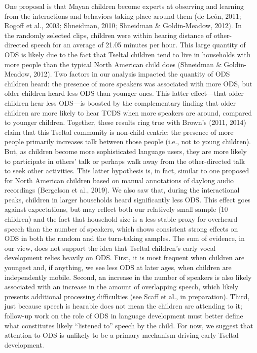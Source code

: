 \documentclass[floatsintext,man]{apa6}
\theoremstyle{definition}
\theoremstyle{definition}
\theoremstyle{definition}
\theoremstyle{remark}
\begin{document}
One proposal is that Mayan children become experts at observing and
learning from the interactions and behaviors taking place around them
(de León, 2011; Rogoff et al., 2003; Shneidman, 2010; Shneidman \&
Goldin-Meadow, 2012). In the randomly selected clips, children were
within hearing distance of other-directed speech for an average of 21.05
minutes per hour. This large quantity of ODS is likely due to the fact
that Tseltal children tend to live in households with more people than
the typical North American child does (Shneidman \& Goldin-Meadow,
2012). Two factors in our analysis impacted the quantity of ODS children
heard: the presence of more speakers was associated with more ODS, but
older children heard less ODS than younger ones. This latter
effect---that older children hear less ODS---is boosted by the
complementary finding that older children are more likely to hear TCDS
when more speakers are around, compared to younger children. Together,
these results ring true with Brown's (2011, 2014) claim that this
Tseltal community is non-child-centric; the presence of more people
primarily increases talk between those people (i.e., not to young
children). But, as children become more sophisticated language users,
they are more likely to participate in others' talk or perhaps walk away
from the other-directed talk to seek other activities. This latter
hypothesis is, in fact, similar to one proposed for North American
children based on manual annotations of daylong audio recordings
(Bergelson et al., 2019). We also saw that, during the interactional
peaks, children in larger households heard significantly less ODS. This
effect goes against expectations, but may reflect both our relatively
small sample (10 children) and the fact that household size is a less
stable proxy for overheard speech than the number of speakers, which
shows consistent strong effects on ODS in both the random and the
turn-taking samples. The sum of evidence, in our view, does not support
the idea that Tseltal children's early vocal development relies heavily
on ODS. First, it is most frequent when children are youngest and, if
anything, we see less ODS at later ages, when children are independently
mobile. Second, an increase in the number of speakers is also likely
associated with an increase in the amount of overlapping speech, which
likely presents additional processing difficulties (see Scaff et al., in
preparation). Third, just because speech is hearable does not mean the
children are attending to it; follow-up work on the role of ODS in
language development must better define what constitutes likely
\enquote{listened to} speech by the child. For now, we suggest that
attention to ODS is unlikely to be a primary mechanism driving early
Tseltal development.
\end{document}
